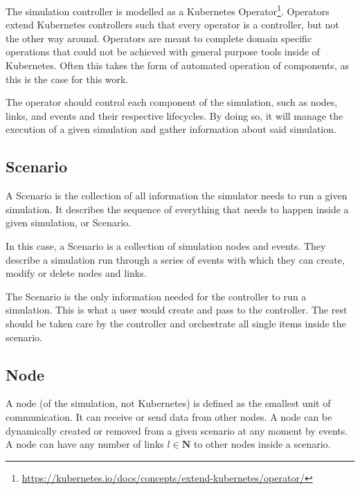 The simulation controller is modelled as a Kubernetes Operator\footnote{\url{https://kubernetes.io/docs/concepts/extend-kubernetes/operator/}}. Operators extend Kubernetes controllers such that every operator is a controller, but not the other way around. Operators are meant to complete domain specific operations that could not be achieved with general purpose tools inside of Kubernetes. Often this takes the form of automated operation of components, as this is the case for this work.

The operator should control each component of the simulation, such as nodes, links, and events and their respective lifecycles. By doing so, it will manage the execution of a given simulation and gather information about said simulation.

\subsection{Scenario \label{sim-scenario}}

A Scenario is the collection of all information the simulator needs to run a given simulation. It describes the sequence of everything that needs to happen inside a given simulation, or Scenario.

In this case, a Scenario is a collection of simulation nodes and events. They describe a simulation run through a series of events with which they can create, modify or delete nodes and links.

The Scenario is the only information needed for the controller to run a simulation. This is what a user would create and pass to the controller. The rest should be taken care by the controller and orchestrate all single items inside the scenario.

\subsection{Node \label{sim-node}}

A node (of the simulation, not Kubernetes) is defined as the smallest unit of communication. It can receive or send data from other nodes. A node can be dynamically created or removed from a given scenario at any moment by events. A node can have any number of links $l \in \mathbf{N}$ to other nodes inside a scenario.

